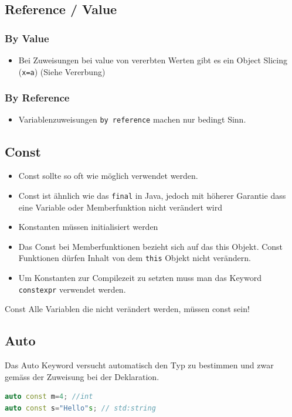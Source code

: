 \subsection{Reference / Value}
\subsubsection{By Value}
\begin{itemize}
	\item Bei Zuweisungen bei value von vererbten Werten gibt es ein Object Slicing (\lstinline|x=a|) (Siehe Vererbung)
\end{itemize}

\subsubsection{By Reference}
\begin{itemize}
	\item Variablenzuweisungen \lstinline|by reference| machen nur bedingt Sinn.
\end{itemize}

\clearpage

\subsection{Const}
\begin{itemize}
	\item Const sollte so oft wie möglich verwendet werden.
	\item Const ist ähnlich wie das \lstinline|final| in Java, jedoch mit höherer Garantie dass eine Variable oder Memberfunktion nicht verändert wird
	\item Konstanten müssen initialisiert werden
	\item Das Const bei Memberfunktionen bezieht sich auf das this Objekt. Const Funktionen dürfen Inhalt von dem \lstinline|this| Objekt nicht verändern.
	\item Um Konstanten zur Compilezeit zu setzten muss man das Keyword \lstinline|constexpr| verwendet werden.
\end{itemize}

\begin{remember}{Const}{}
	Alle Variablen die nicht verändert werden, müssen const sein!
\end{remember}

\subsection{Auto}
Das Auto Keyword versucht automatisch den Typ zu bestimmen und zwar gemäss der Zuweisung bei der Deklaration.
\begin{lstlisting}[language=C++]
auto const m=4; //int
auto const s="Hello"s; // std:string
\end{lstlisting}

